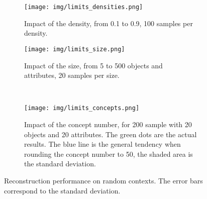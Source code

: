 \begin{figure}[t]
\begin{subfigure}{.48\textwidth}\centering
    \texttt{[image: img/limits\_densities.png]}  
    \caption{Impact of the density, from 0.1 to 0.9, 100 samples per density.}\label{fig:limits_density}
\end{subfigure}\hspace{.03\textwidth}
\begin{subfigure}{.48\textwidth}\centering
    \texttt{[image: img/limits\_size.png]}  
    \caption{Impact of the size, from 5 to 500 objects and attributes, 20 samples per size.}\label{fig:limits_size}
\end{subfigure}\\
\begin{subfigure}{\textwidth}\centering
    \texttt{[image: img/limits\_concepts.png]}  
    \caption{Impact of the concept number, for 200 sample with 20 objects and 20 attributes. The green dots are the actual results. The blue line is the general tendency when rounding the concept number to 50, the shaded area is the standard deviation.}\label{fig:limits_concepts}
\end{subfigure}
\caption{Reconstruction performance on random contexts. The error bars correspond to the standard deviation.}\label{fig:limits}
\end{figure}

